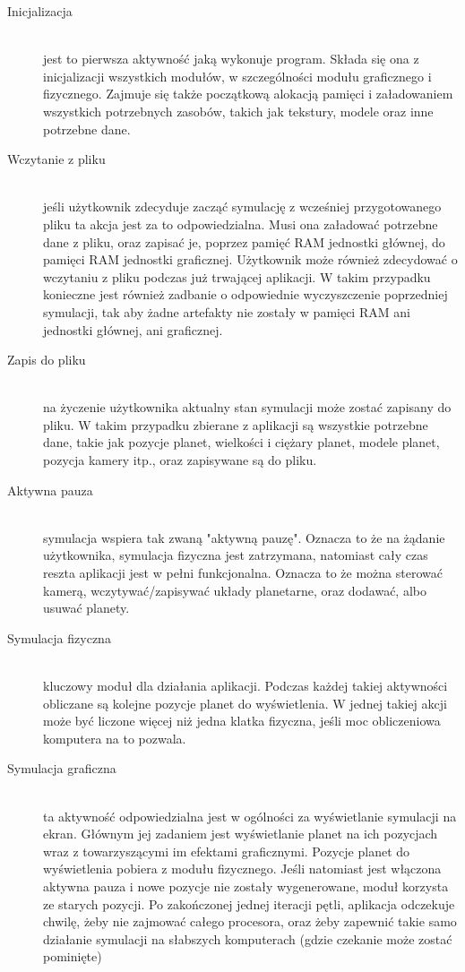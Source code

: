 \begin{description}
	\item[Inicjalizacja] \hfill \\
	jest to pierwsza aktywność jaką wykonuje program. Składa się ona z inicjalizacji wszystkich modułów, w szczególności modułu graficznego i fizycznego. Zajmuje się także początkową alokacją pamięci i załadowaniem wszystkich potrzebnych zasobów, takich jak tekstury, modele oraz inne potrzebne dane.
	\item[Wczytanie z pliku] \hfill \\
	jeśli użytkownik zdecyduje zacząć symulację z wcześniej przygotowanego pliku ta akcja jest za to odpowiedzialna. Musi ona załadować potrzebne dane z pliku, oraz zapisać je, poprzez pamięć RAM jednostki głównej, do pamięci RAM jednostki graficznej. Użytkownik może również zdecydować o wczytaniu z pliku podczas już trwającej aplikacji. W takim przypadku konieczne jest również zadbanie o odpowiednie wyczyszczenie poprzedniej symulacji, tak aby żadne artefakty nie zostały w pamięci RAM ani jednostki głównej, ani graficznej.
	\item[Zapis do pliku] \hfill \\
	na życzenie użytkownika aktualny stan symulacji może zostać zapisany do pliku. W takim przypadku zbierane z aplikacji są wszystkie potrzebne dane, takie jak pozycje planet, wielkości i ciężary planet, modele planet, pozycja kamery itp., oraz zapisywane są do pliku.
	\item[Aktywna pauza] \hfill \\
	symulacja wspiera tak zwaną "aktywną pauzę". Oznacza to że na żądanie użytkownika, symulacja fizyczna jest zatrzymana, natomiast cały czas reszta aplikacji jest w pełni funkcjonalna. Oznacza to że można sterować kamerą, wczytywać/zapisywać układy planetarne, oraz dodawać, albo usuwać planety.
	\item[Symulacja fizyczna] \hfill \\
	kluczowy moduł dla działania aplikacji. Podczas każdej takiej aktywności obliczane są kolejne pozycje planet do wyświetlenia. W jednej takiej akcji może być liczone więcej niż jedna klatka fizyczna, jeśli moc obliczeniowa komputera na to pozwala.
	\item[Symulacja graficzna] \hfill \\
	ta aktywność odpowiedzialna jest w ogólności za wyświetlanie symulacji na ekran. Głównym jej zadaniem jest wyświetlanie planet na ich pozycjach wraz z towarzyszącymi im efektami graficznymi. Pozycje planet do wyświetlenia pobiera z modułu fizycznego. Jeśli natomiast jest włączona aktywna pauza i nowe pozycje nie zostały wygenerowane, moduł korzysta ze starych pozycji. Po zakończonej jednej iteracji pętli, aplikacja odczekuje chwilę, żeby nie zajmować całego procesora, oraz żeby zapewnić takie samo działanie symulacji na słabszych komputerach (gdzie czekanie może zostać pominięte)
\end{description}


